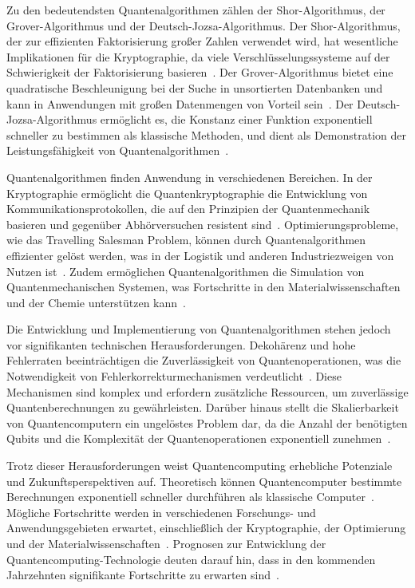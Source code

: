 Zu den bedeutendsten Quantenalgorithmen zählen der Shor-Algorithmus, der Grover-Algorithmus und der 
Deutsch-Jozsa-Algorithmus. Der Shor-Algorithmus, der zur effizienten Faktorisierung großer Zahlen 
verwendet wird, hat wesentliche Implikationen für die Kryptographie, da viele Verschlüsselungssysteme 
auf der Schwierigkeit der Faktorisierung basieren~\cite{shor1999polynomial}. Der Grover-Algorithmus bietet eine 
quadratische Beschleunigung bei der Suche in unsortierten Datenbanken und kann in Anwendungen mit 
großen Datenmengen von Vorteil sein~\cite{grover1996fast}. Der Deutsch-Jozsa-Algorithmus ermöglicht es, die 
Konstanz einer Funktion exponentiell schneller zu bestimmen als klassische Methoden, und dient als 
Demonstration der Leistungsfähigkeit von Quantenalgorithmen~\cite{deutsch1992rapid}.

Quantenalgorithmen finden Anwendung in verschiedenen Bereichen. In der Kryptographie ermöglicht die 
Quantenkryptographie die Entwicklung von Kommunikationsprotokollen, die auf den Prinzipien der 
Quantenmechanik basieren und gegenüber Abhörversuchen resistent sind~\cite{bennett2014quantum}. 
Optimierungsprobleme, wie das Travelling Salesman Problem, können durch Quantenalgorithmen effizienter 
gelöst werden, was in der Logistik und anderen Industriezweigen von Nutzen ist~\cite{farhi2000quantum}. 
Zudem ermöglichen Quantenalgorithmen die Simulation von Quantenmechanischen Systemen, was Fortschritte 
in den Materialwissenschaften und der Chemie unterstützen kann~\cite{aspuru2005simulated}.

Die Entwicklung und Implementierung von Quantenalgorithmen stehen jedoch vor signifikanten technischen 
Herausforderungen. Dekohärenz und hohe Fehlerraten beeinträchtigen die Zuverlässigkeit von Quantenoperationen, 
was die Notwendigkeit von Fehlerkorrekturmechanismen verdeutlicht~\cite{preskill2018quantum}. Diese Mechanismen sind 
komplex und erfordern zusätzliche Ressourcen, um zuverlässige Quantenberechnungen zu gewährleisten. 
Darüber hinaus stellt die Skalierbarkeit von Quantencomputern ein ungelöstes Problem dar, da die Anzahl 
der benötigten Qubits und die Komplexität der Quantenoperationen exponentiell zunehmen~\cite{monroe2013scaling}.

Trotz dieser Herausforderungen weist Quantencomputing erhebliche Potenziale und Zukunftsperspektiven auf. 
Theoretisch können Quantencomputer bestimmte Berechnungen exponentiell schneller durchführen als klassische 
Computer~\cite{nielsen2010quantum}. Mögliche Fortschritte werden in verschiedenen Forschungs- und 
Anwendungsgebieten erwartet, einschließlich der Kryptographie, der Optimierung und der 
Materialwissenschaften~\cite{arute2019quantum}. Prognosen zur Entwicklung der Quantencomputing-Technologie 
deuten darauf hin, dass in den kommenden Jahrzehnten signifikante Fortschritte zu erwarten sind~\cite{ladd2010quantum}.


